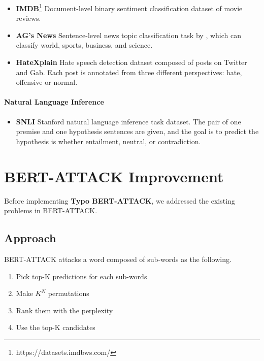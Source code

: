 \documentclass[11pt,a4paper]{article}
\begin{document}
\begin{itemize}
    \item \textbf{IMDB}\footnote{https://datasets.imdbws.com/} Document-level binary sentiment classification dataset of movie reviews. 
    \item \textbf{AG’s News} Sentence-level news topic classification task by \citet{AG_news}, which can classify world, sports, business, and science. 
    \item \textbf{HateXplain} \citep{HateXplain} Hate speech detection dataset composed of posts on Twitter and Gab. Each post is annotated from three different perspectives: hate, offensive or normal. 
\end{itemize}

\paragraph{Natural Language Inference}

\begin{itemize}
    \item \textbf{SNLI} \citep{SNLI} Stanford natural language inference task dataset. The pair of one premise and one hypothesis sentences are given, and the goal is to predict the hypothesis is whether entailment, neutral, or contradiction.
\end{itemize}

\section{BERT-ATTACK Improvement}
\label{sec:BERT-ATTACK Improvement}

Before implementing \textbf{Typo BERT-ATTACK}, we addressed the existing problems in BERT-ATTACK. 

\subsection{Approach}
\label{Improvement:Approach}

BERT-ATTACK attacks a word composed of sub-words as the following. 

\begin{enumerate}
\item Pick top-K predictions for each sub-words
\item Make $K^N$ permutations 
\item Rank them with the perplexity 
\item Use the top-K candidates
\end{enumerate}
 
\end{document}
